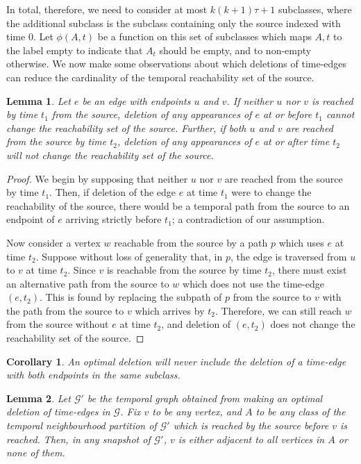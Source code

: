 \documentclass[preprint,12pt]{elsarticle}
\newtheorem{lemma}{Lemma}
\newtheorem{corollary}{Corollary}
\begin{document}
In total, therefore, we need to consider at most $k(k+1)\tau+1$ subclasses, where the additional subclass is the subclass containing only the source indexed with time 0.  Let $\phi(A,t)$ be a function on this set of subclasses which maps $A,t$ to the label empty to indicate that $A_t$ should be empty, and to non-empty otherwise.  
We now make some observations about which deletions of time-edges can reduce the cardinality of the temporal reachability set of the source.
\begin{lemma}\label{lem:iqp-useful-del}
    Let $e$ be an edge with endpoints $u$ and $v$. If neither $u$ nor $v$ is reached by time $t_1$ from the source, deletion of any appearances of $e$ at or before $t_1$ cannot change the reachability set of the source. Further, if both $u$ and $v$ are reached from the source by time $t_2$, deletion of any appearances of $e$ at or after time $t_2$ will not change the reachability set of the source.
\end{lemma}
\begin{proof}
    We begin by supposing that neither $u$ nor $v$ are reached from the source by time $t_1$. Then, if deletion of the edge $e$ at time $t_1$ were to change the reachability of the source, there would be a temporal path from the source to an endpoint of $e$ arriving strictly before $t_1$; a contradiction of our assumption.

    Now consider a vertex $w$ reachable from the source by a path $p$ which uses $e$ at time $t_2$. Suppose without loss of generality that, in $p$, the edge is traversed from $u$ to $v$ at time $t_2$. 
    Since $v$ is reachable from the source by time $t_2$, there must exist an alternative path from the source to $w$ which does not use the time-edge $(e,t_2)$. This is found by replacing the subpath of $p$ from the source to $v$ with the path from the source to $v$ which arrives by $t_2$. Therefore, we can still reach $w$ from the source without $e$ at time $t_2$, and deletion of $(e,t_2)$ does not change the reachability set of the source.
\end{proof}
\begin{corollary}\label{cor:internal-del}
    An optimal deletion will never include the deletion of a time-edge with both endpoints in the same subclass.
\end{corollary}
\begin{lemma}\label{lem:iqp-full-del}
     Let $\mathcal{G}'$ be the temporal graph obtained from making an optimal deletion of time-edges in $\mathcal{G}$. Fix $v$ to be any vertex, and $A$ to be any class of the temporal neighbourhood partition of $\mathcal{G'}$ which is reached by the source before $v$ is reached.  Then, in any snapshot of $\mathcal{G}'$, $v$ is either adjacent to all vertices in $A$ or none of them.
\end{lemma}
\end{document}
